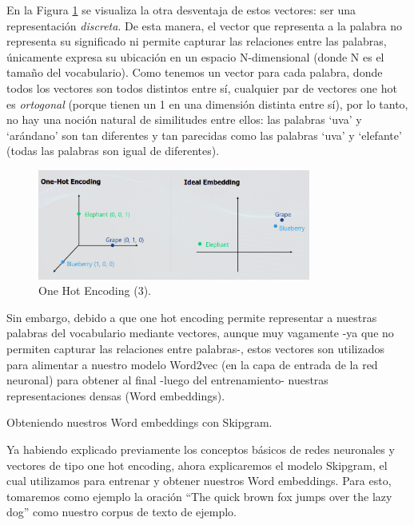 \documentclass[12pt,a4paper]{article}
\makeatletter
\renewcommand\paragraph{\@startsection{paragraph}{4}{\z@}
            {-2.5ex\@plus -1ex \@minus -.25ex}
            {1.25ex \@plus .25ex}
            {\normalfont\normalsize\bfseries}}
\makeatother
\begin{document}
\begin{sloppypar}
En la Figura \ref{fig:Imagen_NLP_18} se visualiza la otra desventaja de estos vectores: ser una representación \textit{discreta}. De esta manera, el vector que representa a la palabra no representa su significado ni permite capturar las relaciones entre las palabras, únicamente expresa su ubicación en un espacio N-dimensional (donde N es el tamaño del vocabulario). Como tenemos un vector para cada palabra, donde todos los vectores son todos distintos entre sí, cualquier par de vectores one hot es \textit{ortogonal} (porque tienen un 1 en una dimensión distinta entre sí), por lo tanto, no hay una noción natural de similitudes entre ellos: las palabras ‘uva’ y ‘arándano’ son tan diferentes y tan parecidas como las palabras ‘uva’ y ‘elefante’ (todas las palabras son igual de diferentes). 

\begin{figure}[H]    
 \centering
 \includegraphics[width=0.8\textwidth]{images/NLP/18.png}
 \caption{One Hot Encoding (3)\cite{NLP_28}.}
 \label{fig:Imagen_NLP_18}
\end{figure}

Sin embargo, debido a que one hot encoding permite representar a nuestras palabras del vocabulario mediante vectores, aunque muy vagamente -ya que no permiten capturar las relaciones entre palabras-, estos vectores son utilizados para alimentar a nuestro modelo Word2vec (en la capa de entrada de la red neuronal) para obtener al final -luego del entrenamiento- nuestras representaciones densas (Word embeddings).

\cleardoublepage

\paragraph{Obteniendo nuestros Word embeddings con Skipgram.}\label{obt_skip}

Ya habiendo explicado previamente los conceptos básicos de redes neuronales y vectores de tipo one hot encoding, ahora explicaremos el modelo Skipgram, el cual utilizamos para entrenar y obtener nuestros Word embeddings. Para esto, tomaremos como ejemplo la oración “The quick brown fox jumps over the lazy dog” como nuestro corpus de texto de ejemplo.


\end{sloppypar}
\end{document}
